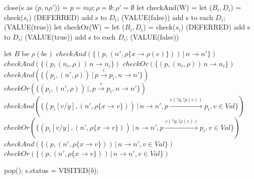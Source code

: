 \documentclass[runningheads,a4paper]{llncs}
\begin{document}
\begin{algorithm} 
	\begin{algorithmic}[1]
		
		\State close(s as ($p, n\rho'$)) =
		\State $p = m\rho; \rho = \emptyset; \rho' = \emptyset$  
		\EndIf
		\State let checkAnd(W) =
		\State let ($B_{i}, D_{i}$) = check($s_{i}$) 
		\Return(DEFERRED)
		\State add s to $D_{i}$; \Return(VALUE(false))
		\Else 
		\State add s to each $D_{i}$; \Return(VALUE(true))
		\EndIf
		\EndFor
		\State let checkOr(W) =
		\State let ($B_{i}, D_{i}$) = check($s_{i}$) 
		\Return(DEFERRED)
		\State add s to $D_{i}$; \Return(VALUE(true))
		\Else 
		\State add s to each $D_{i}$; \Return(VALUE(false))
		\EndIf
		\EndFor
		
		
		\State  let $B$ be 
		\Return $\rho(be)$
		\EndCase
		\Return $checkAnd(\{ (p, (n', \rho\{x\rightarrow \rho(e)\}))\, |\, n \rightarrow n' \})$
		\EndCase
		\Case{$\wedge$} 
		\Return $checkAnd(\{ (p, (n_{i}, \rho))\, n\rightarrow n_{i}\}) $
		\EndCase
		\Case{$\vee$} 
		\Return $checkOr(\{ (p, (n_{i}, \rho))\, n\rightarrow n_{i} \})$
		\EndCase
		\Case{[c]} 
		\Return $checkAnd(\{ (p_{i}, (n', \rho))\,|\, p \xrightarrow{c} p_{i}, n\rightarrow n' \})$
		\EndCase
		\Return $checkOr(\{ (p_{i}, (n',\rho))\,|, p \xrightarrow{c} p_{i}, n \rightarrow n'\})$
		\EndCase
		\Case{[c(?x, !e)]}
		\Return $ checkAnd(\{ (p_{i}[v/y], (n',\rho\{x \rightarrow v\}))\,|\,  n \rightarrow n', p \xrightarrow{c(?y, !\rho(e)) } p_{i},v\in Val\})$
		\EndCase
		\Return $ checkOr(\{ (p_{i}[v/y], (n', \rho\{x \rightarrow v\}))\,|\,  n \rightarrow n', p \xrightarrow{c(?y, !\rho(e))} p_{i},v\in Val\})$
		\EndCase
		\Return $  checkAnd(\{ (p, (n',\rho\{x \rightarrow v\}))\,|\, n \rightarrow n', v \in Val\})$
		\EndCase
		\Return $ checkOr(\{ (p, (n',\rho\{x \rightarrow v\}))\,|\,  n \rightarrow n', v\in Val\})$
		\EndCase
		\EndSwitch
		
		\State pop(); 
		\State s.status = VISITED($b$); 
		\EndIf
		\EndIf
	\end{algorithmic} 
	\caption{$close(s)$}
	\label{alg:algorithm1}
\end{algorithm}	
\end{document}
